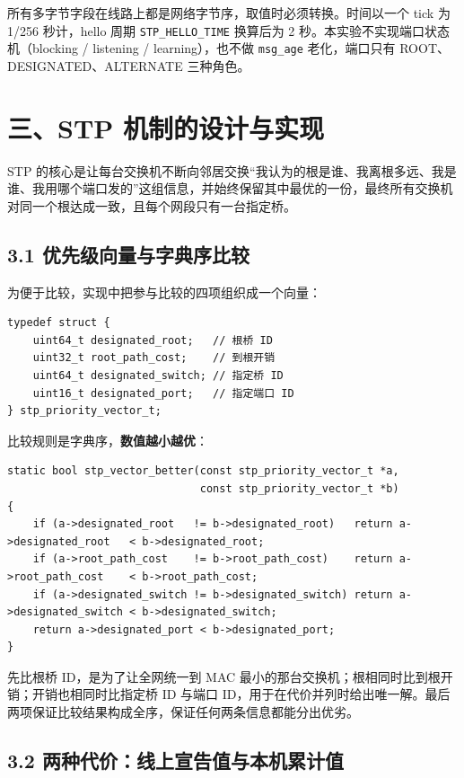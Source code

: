 \documentclass[UTF8,12pt,a4paper,fontset=fandol]{ctexart}
\begin{document}
所有多字节字段在线路上都是网络字节序，取值时必须转换。时间以一个 tick 为 1/256 秒计，hello 周期 \texttt{STP\_HELLO\_TIME} 换算后为 2 秒。本实验不实现端口状态机（\mbox{blocking} / \mbox{listening} / \mbox{learning}），也不做 \texttt{msg\_age} 老化，端口只有 ROOT、\mbox{DESIGNATED}、\mbox{ALTERNATE} 三种角色。

\section*{三、STP 机制的设计与实现}

STP 的核心是让每台交换机不断向邻居交换“我认为的根是谁、我离根多远、我是谁、我用哪个端口发的”这组信息，并始终保留其中最优的一份，最终所有交换机对同一个根达成一致，且每个网段只有一台指定桥。

\subsection*{3.1 优先级向量与字典序比较}

为便于比较，实现中把参与比较的四项组织成一个向量：

\begin{verbatim}
typedef struct {
    uint64_t designated_root;   // 根桥 ID
    uint32_t root_path_cost;    // 到根开销
    uint64_t designated_switch; // 指定桥 ID
    uint16_t designated_port;   // 指定端口 ID
} stp_priority_vector_t;
\end{verbatim}

比较规则是字典序，\textbf{数值越小越优}：

\begin{verbatim}
static bool stp_vector_better(const stp_priority_vector_t *a,
                              const stp_priority_vector_t *b)
{
    if (a->designated_root   != b->designated_root)   return a->designated_root   < b->designated_root;
    if (a->root_path_cost    != b->root_path_cost)    return a->root_path_cost    < b->root_path_cost;
    if (a->designated_switch != b->designated_switch) return a->designated_switch < b->designated_switch;
    return a->designated_port < b->designated_port;
}
\end{verbatim}

先比根桥 ID，是为了让全网统一到 MAC 最小的那台交换机；根相同时比到根开销；开销也相同时比指定桥 ID 与端口 ID，用于在代价并列时给出唯一解。最后两项保证比较结果构成全序，保证任何两条信息都能分出优劣。

\subsection*{3.2 两种代价：线上宣告值与本机累计值}
\end{document}
